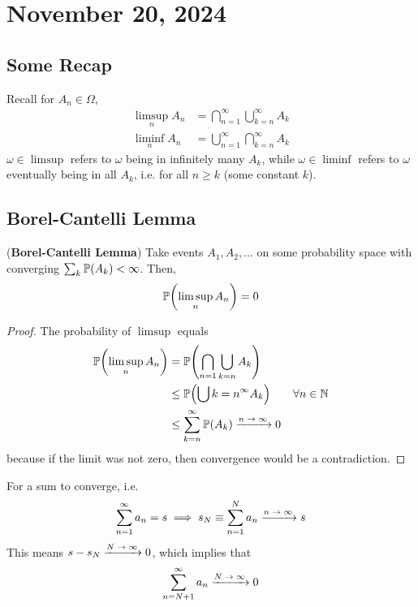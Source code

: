 \section{November 20, 2024}

\subsection{Some Recap}
Recall for $A_n \in \Omega$,
\begin{align}
    \limsup_n A_n &= \bigcap_{n=1}^\infty \bigcup_{k=n}^\infty A_k \\
    \liminf_n A_n &= \bigcup_{n=1}^\infty \bigcap_{k=n}^\infty A_k
\end{align}
$\omega \in \limsup$ refers to $\omega$ being in infinitely many $A_k$, while $\omega \in \liminf$ refers to $\omega$ eventually being in all $A_k$, i.e. for all $n \ge k$ (some constant $k$).


\subsection{Borel-Cantelli Lemma}
\begin{theorem}
    (\textbf{Borel-Cantelli Lemma}) Take events $A_1, A_2, \ldots$ on some probability space with converging $\sum_k \mathbb{P}(A_k) < \infty$. Then,
    \begin{align}
        \mathbb{P}\qty(\limsup_n A_n) = 0
    \end{align}
\end{theorem}

\begin{proof}
    The probability of $\limsup$ equals
    \begin{align}
        \probability\qty(\limsup_n A_n) &= \probability\qty(\bigcap_{n=1} \bigcup_{k=n} A_k)\\
        &\le \probability\qty(\bigcup{k=n}^\infty A_k) \qsp \forall n \in \natural\\
        &\le \sum_{k=n}^\infty \probability(A_k) \ce{->[$n\to\infty$]} 0
    \end{align}
    because if the limit was not zero, then convergence would be a contradiction.
\end{proof}

\begin{aside}
    For a sum to converge, i.e.
    \begin{align}
        \sum_{n=1}^\infty a_n = s \implies s_N \equiv \sum_{n=1}^N a_n \ce{->[$n\to\infty$]} s
    \end{align}
    This means $s - s_N \ce{->[$N\to\infty$]} 0$, which implies that
    \begin{align}
        \sum_{n = N+1}^\infty a_n \ce{->[$N \to\infty$]} 0
    \end{align}
\end{aside}

